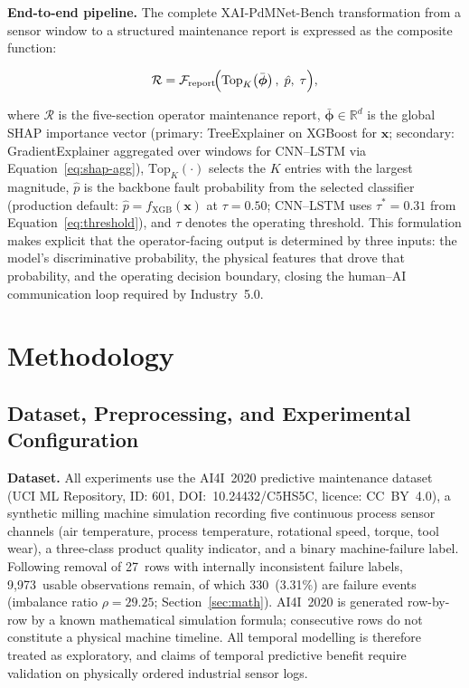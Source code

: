 \documentclass[sensors,article,submit,pdftex,moreauthors]{Definitions/mdpi}
\begin{document}
\textbf{End-to-end pipeline.}
The complete XAI-PdMNet-Bench transformation from a sensor window
to a structured maintenance report is expressed as the composite
function:

\begin{linenomath}
\begin{equation}
\mathcal{R} =
  \mathcal{F}_\text{report}\!\Bigl(
    \text{Top}_K\!\left(\bar{\boldsymbol{\phi}}\right),\;
    \hat{p},\;
    \tau
  \Bigr),
\label{eq:pipeline}
\end{equation}
\end{linenomath}

\noindent where $\mathcal{R}$ is the five-section operator
maintenance report,
$\bar{\boldsymbol{\phi}} \in \mathbb{R}^d$ is the global SHAP
importance vector (primary: TreeExplainer on XGBoost for
$\mathbf{x}$; secondary: GradientExplainer aggregated over windows
for CNN--LSTM via Equation~\ref{eq:shap-agg}),
$\text{Top}_K(\cdot)$ selects the $K$ entries with the largest
magnitude,
$\hat{p}$ is the backbone fault probability from the selected
classifier (production default: $\hat{p} = f_\text{XGB}(\mathbf{x})$
at $\tau = 0.50$; CNN--LSTM uses $\tau^* = 0.31$ from Equation~\ref{eq:threshold}),
and $\tau$ denotes the operating threshold.
This formulation makes explicit that the operator-facing output
is determined by three inputs: the model's discriminative
probability, the physical features that drove that probability,
and the operating decision boundary, closing the human--AI
communication loop required by Industry~5.0.

\section{Methodology}
\label{sec:method}

\subsection{Dataset, Preprocessing, and Experimental Configuration}

\textbf{Dataset.}
All experiments use the AI4I~2020 predictive maintenance dataset
\citep{ref-ai4i2020} (UCI ML Repository, ID: 601,
DOI:~10.24432/C5HS5C, licence: CC~BY~4.0), a synthetic milling
machine simulation recording five continuous process sensor channels
(air temperature, process temperature, rotational speed, torque, tool
wear), a three-class product quality indicator, and a binary
machine-failure label.
Following removal of 27~rows with internally inconsistent failure
labels, 9{,}973~usable observations remain, of which 330~(3.31\%)
are failure events (imbalance ratio $\rho = 29.25$; Section~\ref{sec:math}).
AI4I~2020 is generated row-by-row by a
known mathematical simulation formula; consecutive rows do not
constitute a physical machine timeline.
All temporal modelling is therefore treated as exploratory, and
claims of temporal predictive benefit require validation on
physically ordered industrial sensor logs.
\end{document}
